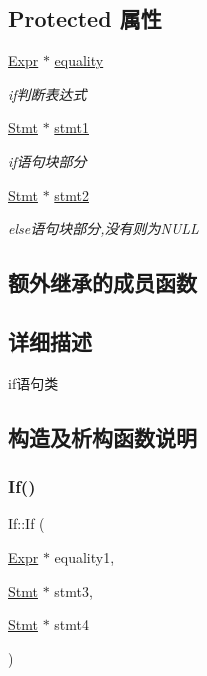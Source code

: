 \subsection*{Protected 属性}
\begin{DoxyCompactItemize}
\item 
\mbox{\label{class_if_a84f2d73109cd8030fcc244ef741b5803}} 
\hyperlink{class_expr}{Expr} $\ast$ \hyperlink{class_if_a84f2d73109cd8030fcc244ef741b5803}{equality}
\begin{DoxyCompactList}\small\item\em if判断表达式 \end{DoxyCompactList}\item 
\mbox{\label{class_if_a3ece7870e5d5b11dd42457e22af00a72}} 
\hyperlink{class_stmt}{Stmt} $\ast$ \hyperlink{class_if_a3ece7870e5d5b11dd42457e22af00a72}{stmt1}
\begin{DoxyCompactList}\small\item\em if语句块部分 \end{DoxyCompactList}\item 
\mbox{\label{class_if_aaf8a095b5a986832928ebdcdb263d41c}} 
\hyperlink{class_stmt}{Stmt} $\ast$ \hyperlink{class_if_aaf8a095b5a986832928ebdcdb263d41c}{stmt2}
\begin{DoxyCompactList}\small\item\em else语句块部分,没有则为\+N\+U\+LL \end{DoxyCompactList}\end{DoxyCompactItemize}
\subsection*{额外继承的成员函数}


\subsection{详细描述}
if语句类 

\subsection{构造及析构函数说明}
\mbox{\label{class_if_a398387169436db838e9935b985a8f4a9}} 
\subsubsection{\texorpdfstring{If()}{If()}}
{\footnotesize\ttfamily If\+::\+If (\begin{DoxyParamCaption}\item[{\hyperlink{class_expr}{Expr} $\ast$}]{equality1,  }\item[{\hyperlink{class_stmt}{Stmt} $\ast$}]{stmt3,  }\item[{\hyperlink{class_stmt}{Stmt} $\ast$}]{stmt4 }\end{DoxyParamCaption})}


